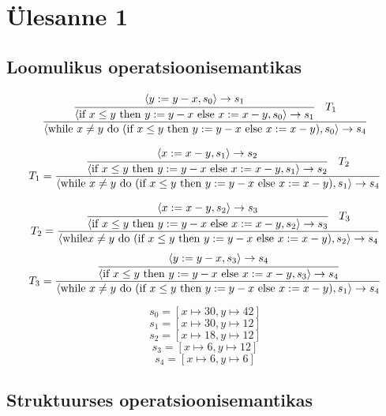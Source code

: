 \section{Ülesanne 1}
\subsection{Loomulikus operatsioonisemantikas}

\[
  \frac{
    \cfrac{
      \langle y := y-x, s_0 \rangle \rightarrow s_1
    }{
      \langle
        \text{if } x \leq y
          \text{ then } y := y-x
          \text{ else } x := x-y
        , s_0
      \rangle \rightarrow s_1
    }
    \quad
    T_1
  }{
    \langle 
    \text{while } x \neq  y \text{ do }
      (\text{if } x \leq y
        \text{ then } y := y-x
        \text{ else } x := x-y)
      , s_0
    \rangle \rightarrow s_4
  }
\]

\[
  T_1 = \frac{
    \cfrac{
      \langle x := x-y, s_1 \rangle \rightarrow s_2
    }{
      \langle 
        \text{if } x \leq y
          \text{ then } y := y-x
          \text{ else } x:= x-y
        , s_1
      \rangle \rightarrow s_2
    }
    \quad
    T_2
  }{
    \langle 
    \text{while } x \neq y \text{ do }
      (\text{if } x \leq y
        \text{ then } y := y-x
        \text{ else } x:= x-y)
      , s_1
    \rangle \rightarrow s_4
  }
\]

\[
  T_2 = \frac{
    \cfrac{
      \langle x := x-y, s_2 \rangle \rightarrow s_3
    }{
      \langle 
        \text{if } x \leq y
          \text{ then } y := y-x
          \text{ else } x := x-y
        , s_2
      \rangle \rightarrow s_3
    }
    \quad
    T_3
  }{
    \langle 
    \text{while} x \neq  y \text{ do }
      (\text{if } x \leq y
        \text{ then } y := y-x
        \text{ else } x := x-y)
      , s_2
    \rangle \rightarrow s_4
  }
\]
\[
  T_3 = \frac{
    \cfrac{
      \langle y := y-x, s_3 \rangle \rightarrow s_4
    }{
      \langle
        \text{if } x \leq y
          \text{ then } y := y-x
          \text{ else } x := x-y
        , s_3
      \rangle \rightarrow s_4
    }
  }{
    \langle
    \text{while } x \neq y \text{ do }
      (\text{if } x \leq y
        \text{ then } y := y-x
        \text{ else } x := x-y )
      , s_1
    \rangle \rightarrow s_4
  }
\]

\[s_0 = [x \mapsto 30, y \mapsto 42]\]
\[s_1 = [x \mapsto 30, y \mapsto 12]\]
\[s_2 = [x \mapsto 18, y \mapsto 12]\]
\[s_3 = [x \mapsto 6, y \mapsto 12]\]
\[s_4 = [x \mapsto 6, y \mapsto 6]\]

\subsection{Struktuurses operatsioonisemantikas}

